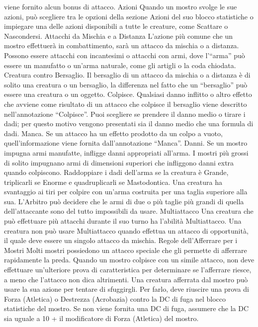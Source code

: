 \begin{multicols}{2}
viene fornito alcun bonus di attacco.
Azioni
Quando un mostro svolge le sue azioni, può scegliere tra
le opzioni della sezione Azioni del suo blocco statistiche o
impiegare una delle azioni disponibili a tutte le creature,
come Scattare o Nascondersi.
Attacchi da Mischia e a Distanza
L’azione più comune che un mostro effettuerà in
combattimento, sarà un attacco da mischia o a
distanza. Possono essere attacchi con incantesimi o
attacchi con armi, dove l’“arma” può essere un
manufatto o un’arma naturale, come gli artigli o la coda
chiodata.
Creatura contro Bersaglio. Il bersaglio di un attacco
da mischia o a distanza è di solito una creatura o un
bersaglio, la differenza nel fatto che un “bersaglio” può
essere una creatura o un oggetto.
Colpisce. Qualsiasi danno inflitto o altro effetto che
avviene come risultato di un attacco che colpisce il
bersaglio viene descritto nell’annotazione “Colpisce”.
Puoi scegliere se prendere il danno medio o tirare i
dadi; per questo motivo vengono presentati sia il danno
medio che una formula di dadi.
Manca. Se un attacco ha un effetto prodotto da un
colpo a vuoto, quell’informazione viene fornita
dall’annotazione “Manca”.
Danni. Se un mostro impugna armi manufatte, infligge
danni appropriati all’arma. I mostri più grossi di solito
impugnano armi di dimensioni superiori che infliggono
danni extra quando colpiscono. Raddoppiare i dadi
dell’arma se la creatura è Grande, triplicarli se Enorme
e quadruplicarli se Mastodontica.
Una creatura ha svantaggio ai tiri per colpire con un’arma
costruita per una taglia superiore alla sua. L’Arbitro può
decidere che le armi di due o più taglie più grandi di quella
dell’attaccante sono del tutto impossibili da usare.
Multiattacco
Una creatura che può effettuare più attacchi durante il
suo turno ha l’abilità Multiattacco. Una creatura non può
usare Multiattacco quando effettua un attacco di
opportunità, il quale deve essere un singolo attacco da
mischia.
Regole dell’Afferrare per i Mostri
Molti mostri possiedono un attacco speciale che gli permette di
afferrare rapidamente la preda. Quando un mostro colpisce con
un simile attacco, non deve effettuare un’ulteriore prova di
caratteristica per determinare se l’afferrare riesce, a meno che
l’attacco non dica altrimenti.
Una creatura afferrata dal mostro può usare la sua azione per
tentare di sfuggirgli. Per farlo, deve riuscire una prova di Forza
(Atletica) o Destrezza (Acrobazia) contro la DC di fuga nel
blocco statistiche del mostro. Se non viene fornita una DC di
fuga, assumere che la DC sia uguale a 10 + il modificatore di
Forza (Atletica) del mostro.

\end{multicols}
